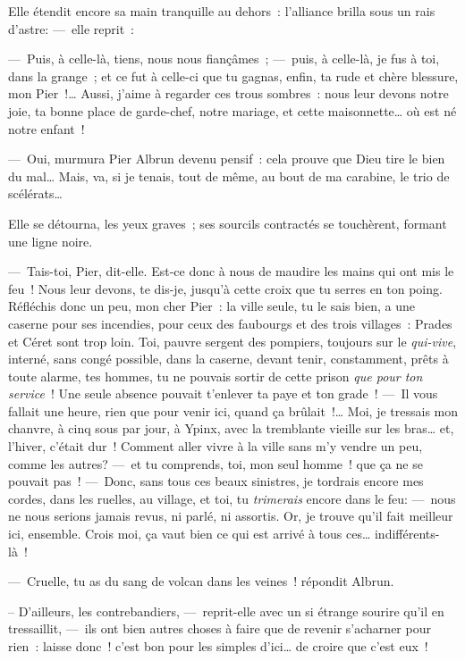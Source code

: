 \documentclass[french,twoside]{book} %
\begin{document}
Elle étendit encore sa main tranquille au   dehors : l’alliance brilla sous un rais d’astre: — elle reprit :\par
— Puis, à celle-là, tiens, nous nous fiançâmes ; — puis, à celle-là, je fus à toi, dans la grange ; et ce fut à celle-ci que tu gagnas, enfin, ta rude et chère blessure, mon Pier !… Aussi, j’aime à regarder ces trous sombres : nous leur devons notre joie, ta bonne place de garde-chef, notre mariage, et cette maisonnette… où est né notre enfant !\par
— Oui, murmura Pier Albrun devenu pensif : cela prouve que Dieu tire le bien du mal… Mais, va, si je tenais, tout de même, au bout de ma carabine, le trio de scélérats…\par
Elle se détourna, les yeux graves ; ses sourcils contractés se touchèrent, formant une ligne noire.\par
— Tais-toi, Pier, dit-elle. Est-ce donc à nous de maudire les mains qui ont mis le feu ! Nous leur devons, te dis-je, jusqu’à cette croix que tu serres en ton poing. Réfléchis donc un peu, mon cher Pier : la ville seule, tu le sais bien, a une caserne pour ses incendies, pour ceux des faubourgs et des trois villages : Prades et Céret   sont trop loin. Toi, pauvre sergent des pompiers, toujours sur le \emph{qui-vive}, interné, sans congé possible, dans la caserne, devant tenir, constamment, prêts à toute alarme, tes hommes, tu ne pouvais sortir de cette prison \emph{que pour ton service} ! Une seule absence pouvait t’enlever ta paye et ton grade ! — Il vous fallait une heure, rien que pour venir ici, quand ça brûlait !… Moi, je tressais mon chanvre, à cinq sous par jour, à Ypinx, avec la tremblante vieille sur les bras… et, l’hiver, c’était dur ! Comment aller vivre à la ville sans m’y vendre un peu, comme les autres? — et tu comprends, toi, mon seul homme ! que ça ne se pouvait pas ! — Donc, sans tous ces beaux sinistres, je tordrais encore mes cordes, dans les ruelles, au village, et toi, tu \emph{trimerais} encore dans le feu: — nous ne nous serions jamais revus, ni parlé, ni assortis. Or, je trouve qu’il fait meilleur ici, ensemble. Crois moi, ça vaut bien ce qui est arrivé à tous ces… indifférents-là !\par
— Cruelle, tu as du sang de volcan dans les veines ! répondit Albrun.\par
   – D’ailleurs, les contrebandiers, — reprit-elle avec un si étrange sourire qu’il en tressaillit, — ils ont bien autres choses à faire que de revenir s’acharner pour rien : laisse donc ! c’est bon pour les simples d’ici… de croire que c’est eux !\par
\end{document}
